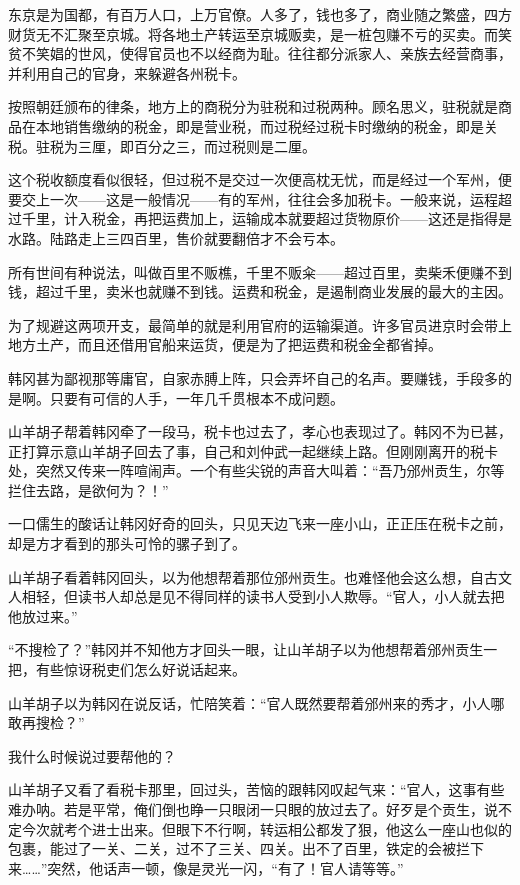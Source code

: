 东京是为国都，有百万人口，上万官僚。人多了，钱也多了，商业随之繁盛，四方财货无不汇聚至京城。将各地土产转运至京城贩卖，是一桩包赚不亏的买卖。而笑贫不笑娼的世风，使得官员也不以经商为耻。往往都分派家人、亲族去经营商事，并利用自己的官身，来躲避各州税卡。

按照朝廷颁布的律条，地方上的商税分为驻税和过税两种。顾名思义，驻税就是商品在本地销售缴纳的税金，即是营业税，而过税经过税卡时缴纳的税金，即是关税。驻税为三厘，即百分之三，而过税则是二厘。

这个税收额度看似很轻，但过税不是交过一次便高枕无忧，而是经过一个军州，便要交上一次——这是一般情况——有的军州，往往会多加税卡。一般来说，运程超过千里，计入税金，再把运费加上，运输成本就要超过货物原价——这还是指得是水路。陆路走上三四百里，售价就要翻倍才不会亏本。

所有世间有种说法，叫做百里不贩樵，千里不贩籴——超过百里，卖柴禾便赚不到钱，超过千里，卖米也就赚不到钱。运费和税金，是遏制商业发展的最大的主因。

为了规避这两项开支，最简单的就是利用官府的运输渠道。许多官员进京时会带上地方土产，而且还借用官船来运货，便是为了把运费和税金全都省掉。

韩冈甚为鄙视那等庸官，自家赤膊上阵，只会弄坏自己的名声。要赚钱，手段多的是啊。只要有可信的人手，一年几千贯根本不成问题。

山羊胡子帮着韩冈牵了一段马，税卡也过去了，孝心也表现过了。韩冈不为已甚，正打算示意山羊胡子回去了事，自己和刘仲武一起继续上路。但刚刚离开的税卡处，突然又传来一阵喧闹声。一个有些尖锐的声音大叫着：“吾乃邠州贡生，尔等拦住去路，是欲何为？！”

一口儒生的酸话让韩冈好奇的回头，只见天边飞来一座小山，正正压在税卡之前，却是方才看到的那头可怜的骡子到了。

山羊胡子看着韩冈回头，以为他想帮着那位邠州贡生。也难怪他会这么想，自古文人相轻，但读书人却总是见不得同样的读书人受到小人欺辱。“官人，小人就去把他放过来。”

“不搜检了？”韩冈并不知他方才回头一眼，让山羊胡子以为他想帮着邠州贡生一把，有些惊讶税吏们怎么好说话起来。

山羊胡子以为韩冈在说反话，忙陪笑着：“官人既然要帮着邠州来的秀才，小人哪敢再搜检？”

我什么时候说过要帮他的？

山羊胡子又看了看税卡那里，回过头，苦恼的跟韩冈叹起气来：“官人，这事有些难办呐。若是平常，俺们倒也睁一只眼闭一只眼的放过去了。好歹是个贡生，说不定今次就考个进士出来。但眼下不行啊，转运相公都发了狠，他这么一座山也似的包裹，能过了一关、二关，过不了三关、四关。出不了百里，铁定的会被拦下来……”突然，他话声一顿，像是灵光一闪，“有了！官人请等等。”

